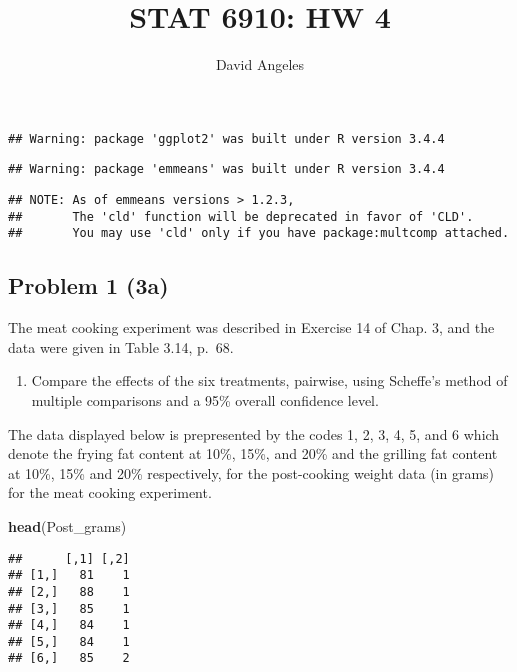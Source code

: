 \documentclass[12pt,]{article}
\title{STAT 6910: HW 4}
\author{David Angeles}
\date{}
\newenvironment{Shaded}{\begin{snugshade}}{\end{snugshade}}
\newcommand{\KeywordTok}[1]{\textcolor[rgb]{0.13,0.29,0.53}{\textbf{#1}}}
\newcommand{\NormalTok}[1]{#1}
\providecommand{\tightlist}{%
  \setlength{\itemsep}{0pt}\setlength{\parskip}{0pt}}
\begin{document}
\maketitle

\begin{verbatim}
## Warning: package 'ggplot2' was built under R version 3.4.4
\end{verbatim}

\begin{verbatim}
## Warning: package 'emmeans' was built under R version 3.4.4
\end{verbatim}

\begin{verbatim}
## NOTE: As of emmeans versions > 1.2.3,
##       The 'cld' function will be deprecated in favor of 'CLD'.
##       You may use 'cld' only if you have package:multcomp attached.
\end{verbatim}

\subsection{Problem 1 (3a)}\label{problem-1-3a}

The meat cooking experiment was described in Exercise 14 of Chap. 3, and
the data were given in Table 3.14, p.~68.

\begin{enumerate}
\def\labelenumi{(\alph{enumi})}
\tightlist
\item
  Compare the effects of the six treatments, pairwise, using Scheffe's
  method of multiple comparisons and a 95\% overall confidence level.
\end{enumerate}

The data displayed below is prepresented by the codes 1, 2, 3, 4, 5, and
6 which denote the frying fat content at 10\%, 15\%, and 20\% and the
grilling fat content at 10\%, 15\% and 20\% respectively, for the
post-cooking weight data (in grams) for the meat cooking experiment.

\begin{Shaded}
\begin{Highlighting}[]
\KeywordTok{head}\NormalTok{(Post_grams) }
\end{Highlighting}
\end{Shaded}

\begin{verbatim}
##      [,1] [,2]
## [1,]   81    1
## [2,]   88    1
## [3,]   85    1
## [4,]   84    1
## [5,]   84    1
## [6,]   85    2
\end{verbatim}
\end{document}
